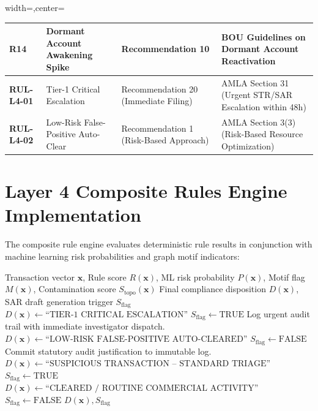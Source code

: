 \begin{table}[hbt!]
\begin{adjustbox}{width=\textwidth,center=\textwidth}
\begin{tabular}{|l|l|l|l|}
\hline
\textbf{R14} & Dormant Account Awakening Spike & Recommendation 10 & BOU Guidelines on Dormant Account Reactivation \\
\hline
\hline
\textbf{RUL-L4-01} & Tier-1 Critical Escalation & Recommendation 20 (Immediate Filing) & AMLA Section 31 (Urgent STR/SAR Escalation within 48h) \\
\hline
\textbf{RUL-L4-02} & Low-Risk False-Positive Auto-Clear & Recommendation 1 (Risk-Based Approach) & AMLA Section 3(3) (Risk-Based Resource Optimization) \\
\hline
\end{tabular}
\end{adjustbox}
\end{table}

\section{Layer 4 Composite Rules Engine Implementation}
The composite rule engine evaluates deterministic rule results in conjunction with machine learning risk probabilities and graph motif indicators:

\begin{algorithm}[H]
\caption{Layer 4 Composite Decisioning Algorithm}
\begin{algorithmic}[1]
\REQUIRE Transaction vector $\mathbf{x}$, Rule score $R(\mathbf{x})$, ML risk probability $P(\mathbf{x})$, Motif flag $M(\mathbf{x})$, Contamination score $S_{\text{topo}}(\mathbf{x})$
\ENSURE Final compliance disposition $D(\mathbf{x})$, SAR draft generation trigger $S_{\text{flag}}$
    \STATE $D(\mathbf{x}) \leftarrow \text{``TIER-1 CRITICAL ESCALATION''}$
    \STATE $S_{\text{flag}} \leftarrow \text{TRUE}$
    \STATE Log urgent audit trail with immediate investigator dispatch.
    \STATE $D(\mathbf{x}) \leftarrow \text{``LOW-RISK FALSE-POSITIVE AUTO-CLEARED''}$
    \STATE $S_{\text{flag}} \leftarrow \text{FALSE}$
    \STATE Commit statutory audit justification to immutable log.
    \STATE $D(\mathbf{x}) \leftarrow \text{``SUSPICIOUS TRANSACTION -- STANDARD TRIAGE''}$
    \STATE $S_{\text{flag}} \leftarrow \text{TRUE}$
\ELSE
    \STATE $D(\mathbf{x}) \leftarrow \text{``CLEARED / ROUTINE COMMERCIAL ACTIVITY''}$
    \STATE $S_{\text{flag}} \leftarrow \text{FALSE}$
\ENDIF
\RETURN $D(\mathbf{x}), S_{\text{flag}}$
\end{algorithmic}
\end{algorithm}
